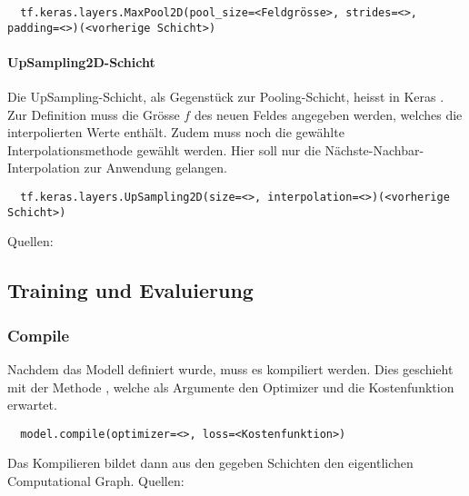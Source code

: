 \begin{verbatim}
  tf.keras.layers.MaxPool2D(pool_size=<Feldgrösse>, strides=<>, padding=<>)(<vorherige Schicht>)
\end{verbatim}

\paragraph{UpSampling2D-Schicht}
Die UpSampling-Schicht, als Gegenstück zur Pooling-Schicht, heisst in Keras
. Zur Definition muss die Grösse $f$ des neuen Feldes
angegeben werden, welches die interpolierten Werte enthält.
Zudem muss noch die gewählte Interpolationsmethode gewählt werden. Hier soll nur
die Nächste-Nachbar-Interpolation zur Anwendung gelangen.

\begin{verbatim}
  tf.keras.layers.UpSampling2D(size=<>, interpolation=<>)(<vorherige Schicht>)
\end{verbatim}
\para{}
Quellen: \cite{net:keras_docs} \cite{net:tf_docs}

\subsection{Training und Evaluierung}

\subsubsection{Compile}
Nachdem das Modell definiert wurde, muss es kompiliert werden.
Dies geschieht mit der Methode , welche als
Argumente den Optimizer und die Kostenfunktion erwartet.
\begin{verbatim}
  model.compile(optimizer=<>, loss=<Kostenfunktion>)
\end{verbatim}
Das Kompilieren bildet dann aus den gegeben Schichten den eigentlichen
Computational Graph.
\para{}
Quellen: \cite{net:keras_docs} \cite{net:tf_docs}


